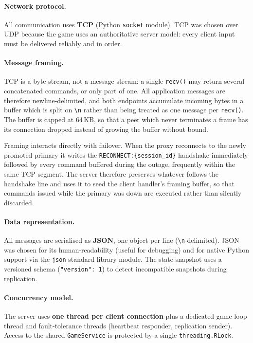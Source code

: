 \documentclass{scrartcl}
\begin{document}
\paragraph{Network protocol.}
All communication uses \textbf{TCP} (Python \texttt{socket} module).
TCP was chosen over UDP because the game uses an authoritative server model: every client input must be delivered reliably and in order.

\paragraph{Message framing.}
TCP is a byte stream, not a message stream: a single \texttt{recv()} may return
several concatenated commands, or only part of one. All application messages are
therefore newline-delimited, and both endpoints accumulate incoming bytes in a
buffer which is split on \texttt{\textbackslash n} rather than being treated as
one message per \texttt{recv()}. The buffer is capped at 64\,KB, so that a peer
which never terminates a frame has its connection dropped instead of growing the
buffer without bound.

Framing interacts directly with failover. When the proxy reconnects to the newly
promoted primary it writes the \texttt{RECONNECT:\{session\_id\}} handshake
immediately followed by every command buffered during the outage, frequently
within the same TCP segment. The server therefore preserves whatever follows the
handshake line and uses it to seed the client handler's framing buffer, so that
commands issued while the primary was down are executed rather than silently
discarded.

\paragraph{Data representation.}
All messages are serialised as \textbf{JSON}, one object per line (\texttt{{\textbackslash}n}-delimited).
JSON was chosen for its human-readability (useful for debugging) and for native Python support via the \texttt{json} standard library module.
The state snapshot uses a versioned schema (\texttt{"version": 1}) to detect incompatible snapshots during replication.

\paragraph{Concurrency model.}
The server uses \textbf{one thread per client connection} plus a dedicated game-loop thread and fault-tolerance threads (heartbeat responder, replication sender).
Access to the shared \texttt{GameService} is protected by a single \texttt{threading.RLock}.
\end{document}
